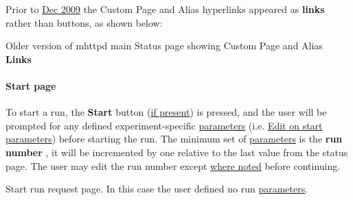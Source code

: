 \label{RC_mhttpd_status_page_redesign_RC_mhttpd_old_alias_buttons}
\hypertarget{RC_mhttpd_status_page_redesign_RC_mhttpd_old_alias_buttons}{}
  Prior to \hyperlink{NDF_ndf_dec_2009}{Dec 2009}  the Custom Page and Alias hyperlinks appeared as {\bfseries links} rather than buttons, as shown below: \par
\par
\par
 \begin{center} Older version of mhttpd main Status page showing Custom Page and Alias {\bfseries Links}  \end{center}  \par
\par
\par




\label{index_end}
\hypertarget{index_end}{}
 \par
 \paragraph{Start page}\label{RC_mhttpd_Start_page}
\label{RC_mhttpd_Start_page_idx_mhttpd_page_start}
\hypertarget{RC_mhttpd_Start_page_idx_mhttpd_page_start}{}
 \par




\par


To start a run, the {\bfseries Start} button (\hyperlink{RC_mhttpd_status_page_features_RC_mhttpd_status_menu_buttons}{if present}) is pressed, and the user will be prompted for any defined experiment-\/specific \hyperlink{structparameters}{parameters} (i.e. \hyperlink{RC_customize_ODB_RC_Edit_On_Start}{Edit on start} \hyperlink{structparameters}{parameters}) before starting the run. The minimum set of \hyperlink{structparameters}{parameters} is the {\bfseries  run number }, it will be incremented by one relative to the last value from the status page. The user may edit the run number except \hyperlink{RC_mhttpd_Start_page_RC_Prevent_Edit_RN}{where noted} before continuing.

\par
\par
\par
 \begin{center}  Start run request page. In this case the user defined no run \hyperlink{structparameters}{parameters}. \par
\par
\par
  \end{center}  \par
\par
\par


